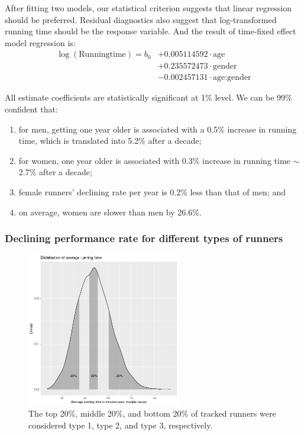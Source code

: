 \documentclass[12pt]{article}
\begin{document}
After fitting two models, our statistical criterion suggests that linear
regression should be preferred.
Residual diagnostics also suggest that log-transformed running time should
be the response variable.
And the result of time-fixed effect model regression is:
\begin{align*}
	\log(\text{Runningtime})
	= b_0 &+ 0.005114592 \cdot \text{age}
	\\&
	+ 0.235572473 \cdot \text{gender}
	\\&
	- 0.002457131 \cdot \text{age:gender}
\end{align*}


All estimate coefficients are statistically significant at 1\% level.
We can be 99\% confident that:
\begin{enumerate}[label=(\roman*)]
	\item for men, getting one year older is associated with a 0.5\%
		increase in running time, which is translated into 5.2\% after a decade;
	\item for women, one year older is associated with 0.3\% increase in
		running time $\sim$ 2.7\% after a decade;
	\item female runners' declining rate per year is 0.2\% less than that of
		men; and
	\item on average, women are slower than men by 26.6\%.
\end{enumerate}

\subsubsection*{Declining performance rate for different types of runners}

\begin{figure}[ht]
	\centering
	\includegraphics[width = 0.6\textwidth]
	{../figure/elite_vs_nonelite_gr0-2.png}
	\caption{
		The top 20\%, middle 20\%, and bottom 20\% of
		tracked runners were considered type 1, type 2, and
		type 3, respectively.
	}
	\label{type123-dist}
\end{figure}
\end{document}
